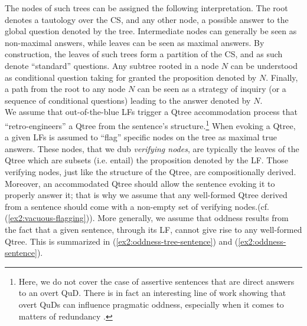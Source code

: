 The nodes of such trees can be assigned the following interpretation. The root denotes a tautology over the CS, and any other node, a possible answer to the global question denoted by the tree. Intermediate nodes can generally be seen as non-maximal answers, while leaves can be seen as maximal answers. By construction, the leaves of such trees form a partition of the CS, and as such denote ``standard'' questions. Any subtree rooted in a node $N$ can be understood as conditional question taking for granted the proposition denoted by $N$. Finally, a path from the root to any node $N$ can be seen as a strategy of inquiry (or a sequence of conditional questions) leading to the answer denoted by $N$.\\

We assume that out-of-the-blue LFs trigger a Qtree accommodation process that ``retro-engineers'' a Qtree from the sentence's structure.\footnote{Here, we do not cover the case of assertive sentences that are direct answers to an overt QuD. There is in fact an interesting line of work showing that overt QuDs can influence pragmatic oddness, especially when it comes to matters of redundancy \citep{Haslinger2023}.} When evoking a Qtree, a given LFs is assumed to ``flag'' specific nodes on the tree as maximal true answers. These nodes, that we dub \textit{verifying nodes}, are typically the leaves of the Qtree which are subsets (i.e. entail) the proposition denoted by the LF. Those verifying nodes, just like the structure of the Qtree, are compositionally derived. Moreover, an accommodated Qtree should allow the sentence evoking it to properly answer it; that is why we assume that any well-formed Qtree derived from a sentence should come with a non-empty set of verifying nodes.(cf. (\ref{ex2:vacuous-flagging})). More generally, we assume that oddness results from the fact that a given sentence, through its LF, cannot give rise to any well-formed Qtree. This is summarized in (\ref{ex2:oddness-tree-sentence}) and (\ref{ex2:oddness-sentence}).

\begin{exe}
	\label{ex2:vacuous-flagging}
	\label{ex2:oddness-tree-sentence}
	\label{ex2:oddness-sentence}
\end{exe}

